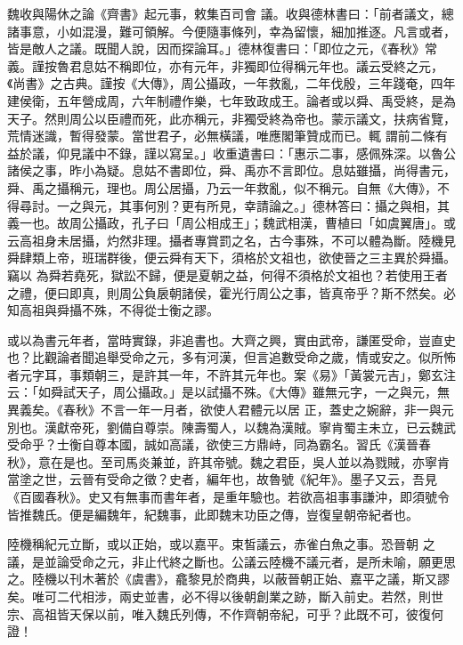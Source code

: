 \begin{pinyinscope}
 魏收與陽休之論《齊書》起元事，敕集百司會
 議。收與德林書曰：「前者議文，總諸事意，小如混漫，難可領解。今便隨事條列，幸為留懷，細加推逐。凡言或者，皆是敵人之議。既聞人說，因而探論耳。」德林復書曰：「即位之元，《春秋》常義。謹按魯君息姑不稱即位，亦有元年，非獨即位得稱元年也。議云受終之元，《尚書》之古典。謹按《大傳》，周公攝政，一年救亂，二年伐殷，三年踐奄，四年建侯衛，五年營成周，六年制禮作樂，七年致政成王。論者或以舜、禹受終，是為天子。然則周公以臣禮而死，此亦稱元，非獨受終為帝也。蒙示議文，扶病省覽，荒情迷識，暫得發蒙。當世君子，必無橫議，唯應閣筆贊成而已。輒
 謂前二條有益於議，仰見議中不錄，謹以寫呈。」收重遺書曰：「惠示二事，感佩殊深。以魯公諸侯之事，昨小為疑。息姑不書即位，舜、禹亦不言即位。息姑雖攝，尚得書元，舜、禹之攝稱元，理也。周公居攝，乃云一年救亂，似不稱元。自無《大傳》，不得尋討。一之與元，其事何別？更有所見，幸請論之。」德林答曰：攝之與相，其義一也。故周公攝政，孔子曰「周公相成王」；魏武相漢，曹植曰「如虞翼唐」。或云高祖身未居攝，灼然非理。攝者專賞罰之名，古今事殊，不可以體為斷。陸機見舜肆類上帝，班瑞群後，便云舜有天下，須格於文祖也，欲使晉之三主異於舜攝。竊以
 為舜若堯死，獄訟不歸，便是夏朝之益，何得不須格於文祖也？若使用王者之禮，便曰即真，則周公負扆朝諸侯，霍光行周公之事，皆真帝乎？斯不然矣。必知高祖與舜攝不殊，不得從士衡之謬。



 或以為書元年者，當時實錄，非追書也。大齊之興，實由武帝，謙匿受命，豈直史也？比觀論者聞追舉受命之元，多有河漢，但言追數受命之歲，情或安之。似所怖者元字耳，事類朝三，是許其一年，不許其元年也。案《易》「黃裳元吉」，鄭玄注云：「如舜試天子，周公攝政。」是以試攝不殊。《大傳》雖無元字，一之與元，無異義矣。《春秋》不言一年一月者，欲使人君體元以居
 正，蓋史之婉辭，非一與元別也。漢獻帝死，劉備自尊崇。陳壽蜀人，以魏為漢賊。寧肯蜀主未立，已云魏武受命乎？士衡自尊本國，誠如高議，欲使三方鼎峙，同為霸名。習氏《漢晉春秋》，意在是也。至司馬炎兼並，許其帝號。魏之君臣，吳人並以為戮賊，亦寧肯當塗之世，云晉有受命之徵？史者，編年也，故魯號《紀年》。墨子又云，吾見《百國春秋》。史又有無事而書年者，是重年驗也。若欲高祖事事謙沖，即須號令皆推魏氏。便是編魏年，紀魏事，此即魏末功臣之傳，豈復皇朝帝紀者也。



 陸機稱紀元立斷，或以正始，或以嘉平。束皙議云，赤雀白魚之事。恐晉朝
 之議，是並論受命之元，非止代終之斷也。公議云陸機不議元者，是所未喻，願更思之。陸機以刊木著於《虞書》，龕黎見於商典，以蔽晉朝正始、嘉平之議，斯又謬矣。唯可二代相涉，兩史並書，必不得以後朝創業之跡，斷入前史。若然，則世宗、高祖皆天保以前，唯入魏氏列傳，不作齊朝帝紀，可乎？此既不可，彼復何證！




\end{pinyinscope}

